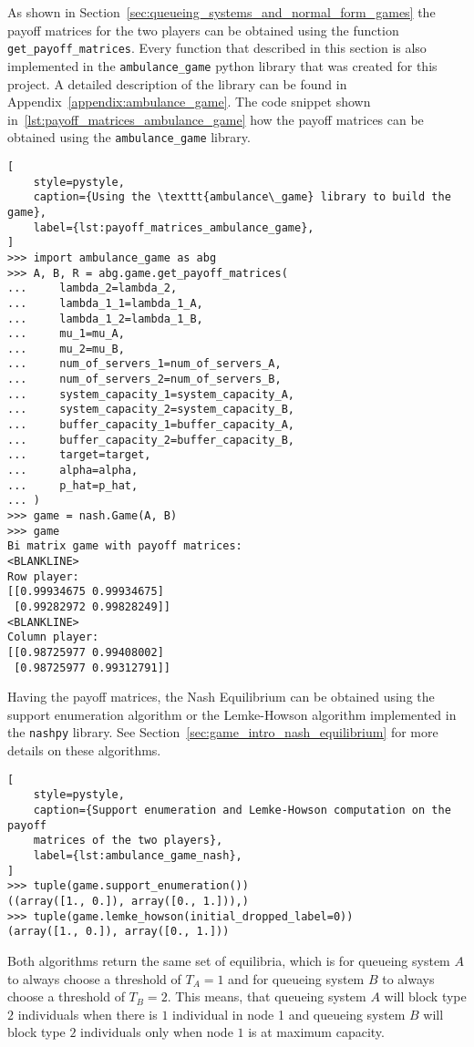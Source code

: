 As shown in Section~\ref{sec:queueing_systems_and_normal_form_games} the payoff
matrices for the two players can be obtained using the function
\texttt{get\_payoff\_matrices}.
Every function that described in this section is also implemented in the
\texttt{ambulance\_game} python library that was created for
this project.
A detailed description of the library can be found in
Appendix~\ref{appendix:ambulance_game}.
The code snippet shown in~\ref{lst:payoff_matrices_ambulance_game} how the
payoff matrices can be obtained using the
\texttt{ambulance\_game} library.

\begin{lstlisting}[
    style=pystyle,
    caption={Using the \texttt{ambulance\_game} library to build the game},
    label={lst:payoff_matrices_ambulance_game},
]
>>> import ambulance_game as abg
>>> A, B, R = abg.game.get_payoff_matrices(
...     lambda_2=lambda_2,
...     lambda_1_1=lambda_1_A,
...     lambda_1_2=lambda_1_B,
...     mu_1=mu_A,
...     mu_2=mu_B,
...     num_of_servers_1=num_of_servers_A,
...     num_of_servers_2=num_of_servers_B,
...     system_capacity_1=system_capacity_A,
...     system_capacity_2=system_capacity_B,
...     buffer_capacity_1=buffer_capacity_A,
...     buffer_capacity_2=buffer_capacity_B,
...     target=target,
...     alpha=alpha,
...     p_hat=p_hat,
... )
>>> game = nash.Game(A, B)
>>> game
Bi matrix game with payoff matrices:
<BLANKLINE>
Row player:
[[0.99934675 0.99934675]
 [0.99282972 0.99828249]]
<BLANKLINE>
Column player:
[[0.98725977 0.99408002]
 [0.98725977 0.99312791]]

\end{lstlisting}

Having the payoff matrices, the Nash Equilibrium can be obtained using the
support enumeration algorithm or the Lemke-Howson algorithm implemented in the
\texttt{nashpy} library.
See Section~\ref{sec:game_intro_nash_equilibrium} for more details on these
algorithms.

\begin{lstlisting}[
    style=pystyle,
    caption={Support enumeration and Lemke-Howson computation on the payoff
    matrices of the two players},
    label={lst:ambulance_game_nash},
]
>>> tuple(game.support_enumeration())
((array([1., 0.]), array([0., 1.])),)
>>> tuple(game.lemke_howson(initial_dropped_label=0))
(array([1., 0.]), array([0., 1.]))

\end{lstlisting}

Both algorithms return the same set of equilibria, which is for queueing system
\(A\) to always choose a threshold of \(T_A = 1\) and for queueing system
\(B\) to always choose a threshold of \(T_B = 2\).
This means, that queueing system \(A\) will block type \(2\) individuals when
there is \(1\) individual in node 1 and queueing system \(B\) will block type
\(2\) individuals only when node \(1\) is at maximum capacity.

